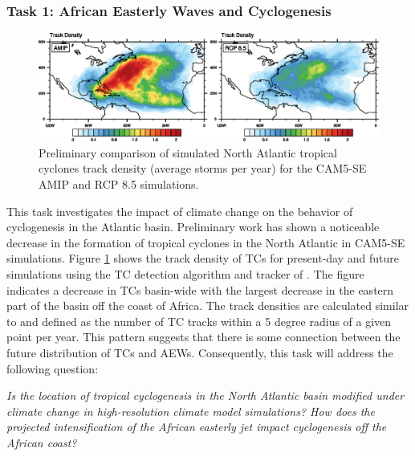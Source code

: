 \documentclass[11pt]{article}
\begin{document}
\subsubsection{Task 1: African Easterly Waves and Cyclogenesis} 

\begin{figure}[h]
\begin{center}
\includegraphics[width=6.5in]{NA_track_density.eps}
\end{center}
\caption{Preliminary comparison of simulated North Atlantic tropical cyclones track density (average storms per year) for the CAM5-SE AMIP and RCP 8.5 simulations.} \label{fig:NA_density}
\end{figure}

This task investigates the impact of climate change on the behavior of cyclogenesis in the Atlantic basin.  Preliminary work has shown a noticeable decrease in the formation of tropical cyclones in the North Atlantic in CAM5-SE simulations.  Figure \ref{fig:NA_density} shows the track density of TCs for present-day and future simulations using the TC detection algorithm and tracker of \citet{Zhao2009}. The figure indicates a decrease in TCs basin-wide with the largest decrease in the eastern part of the basin off the coast of Africa. The track densities are calculated similar to \citet{Done2013} and defined as the number of TC tracks within a 5 degree radius of a given point per year. This pattern suggests that there is some connection between the future distribution of TCs and AEWs.  Consequently, this task will address the following question:

\textit{Is the location of tropical cyclogenesis in the North Atlantic basin modified under climate change in high-resolution climate model simulations? How does the projected intensification of the African easterly jet impact cyclogenesis off the African coast?}
\end{document}
